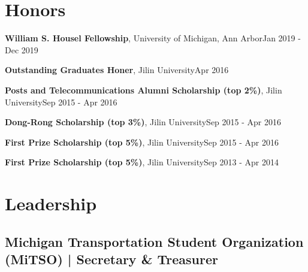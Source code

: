 \documentclass[]{Keval-resume}
\begin{document}
\sectionsep
\section{Honors} 
\hrulefill
\postsectionsep 

\begin{cvitems}
\item 
    {\textbf{William S. Housel Fellowship}, University of Michigan, Ann Arbor\hfill Jan 2019 - Dec 2019}
\item 
    {\textbf{Outstanding Graduates Honer}, Jilin University\hfill Apr 2016}
\item 
    {\textbf{Posts and Telecommunications Alumni Scholarship (top 2\%)}, Jilin University\hfill Sep 2015 - Apr 2016}
\item 
    {\textbf{Dong-Rong Scholarship (top 3\%)}, Jilin University\hfill Sep 2015 - Apr 2016}
\item 
    {\textbf{First Prize Scholarship (top 5\%)}, Jilin University\hfill Sep 2015 - Apr 2016}
\item
    {\textbf{First Prize Scholarship (top 5\%)}, Jilin University\hfill  Sep 2013 - Apr 2014}
\end{cvitems} 
\sectionsep

\section{Leadership}
\hrulefill
\postsectionsep 

\subsection{Michigan Transportation Student Organization (MiTSO) | \normalfont Secretary \& Treasurer\hfill \normalfont}




\end{document}

